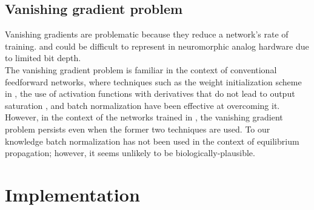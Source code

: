 \documentclass[format=sigconf]{acmart}
\newcommand{\npar}{\\\indent}
\begin{document}
\subsection{Vanishing gradient problem}
\label{sec:vangrad}

Vanishing gradients are problematic because they reduce a network's rate of training. and could be difficult to represent in neuromorphic analog hardware due to limited bit depth.
\npar
The vanishing gradient problem is familiar in the context of conventional feedforward networks, where techniques such as the weight initialization scheme in \cite{glorot2010}, the use of activation functions with derivatives that do not lead to output saturation \cite{schmidhuber2015}, and batch normalization \cite{ioffe2015} have been effective at overcoming it. However, in the context of the networks trained in \cite{scellier17}, the vanishing gradient problem persists even when the former two techniques are used. To our knowledge batch normalization has not been used in the context of equilibrium propagation; however, it seems unlikely to be biologically-plausible.

\section{Implementation}
\label{sec:implementation}
\end{document}
